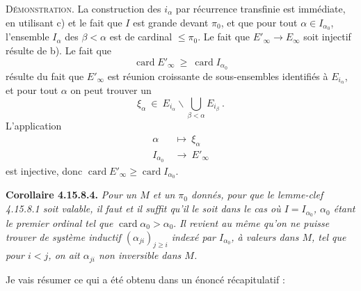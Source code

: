 \documentclass[11pt]{article}
\newcommand{\printedpage}[1]{\marginpar{\footnotesize p.~#1}}
\newcommand{\msp}[1]{\marginpar{\footnotesize [#1]}}
\newcommand{\card}{\operatorname{card}}
\begin{document}
\textsc{Démonstration}. La construction des $i_\alpha$ par récurrence transfinie est immédiate, en utilisant c) et le fait que $I$ est grande devant $\pi_0$, et que pour tout $\alpha \in I_{\alpha_0}$, l'ensemble $I_\alpha$
\printedpage{178}
des $\beta < \alpha$ est de cardinal $\leqslant \pi_0$. Le fait que $E'_\infty \longrightarrow E_\infty$ soit injectif résulte de b). Le fait que
\[
\card E'_\infty \ \geqslant \ \card I_{\alpha_0}
\]
résulte du fait que $E'_\infty$ est réunion croissante de sous-ensembles identifiés à $E_{i_\alpha}$, et pour tout
\msp{page 460}
$\alpha$ on peut trouver un
\[
\xi_\alpha \ \in \ E_{i_\alpha}\backslash \bigcup_{\beta<\alpha} E_{i_\beta} \ .
\]
L'application
\[
\begin{aligned}
\alpha \ &\longmapsto \ \xi_\alpha\\
I_{\alpha_0} \ &\longrightarrow \ E'_\infty
\end{aligned}
\]
est injective, donc $\card E'_\infty \geqslant \card I_{\alpha_0}$.

\textbf{Corollaire 4.15.8.4.} \textit{Pour un $M$ et un $\pi_0$ donnés, pour que le lemme-clef 4.15.8.1 soit valable, il faut et il suffit qu'il le soit dans le cas où $I = I_{\alpha_0}$, $\alpha_0$ étant le premier ordinal tel que} $\card \alpha_0 > \alpha_0$. \textit{Il revient au même qu'on ne puisse trouver de système inductif $(\alpha_{ji})_{j\geqslant i}$ indexé par $I_{\alpha_0}$, à valeurs dans $M$, tel que pour $i < j$, on ait $\alpha_{ji}$ non inversible dans $M$.} %

\msp{page 461}
Je vais résumer ce qui a été obtenu dans un énoncé récapitulatif :
\end{document}
